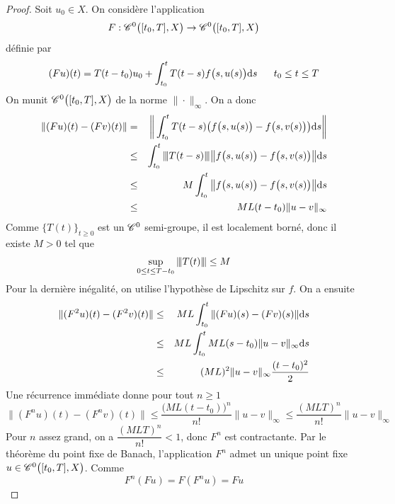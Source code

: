 \begin{proof}
    Soit $u_0 \in X$. On considère l'application 
    \begin{equation*}
        F : \mathscr{C}^0\big([t_0,T],X\big) \rightarrow \mathscr{C}^0\big([t_0,T],X\big)
    \end{equation*}
    définie par 
    \begin{equation*}
        (Fu)(t) = T(t-t_0)u_0 + \int_{t_0}^t T(t-s)f\big(s,u(s)\big)\mathrm{d} s \ \ \ \ \ t_0 \leq t \leq T
    \end{equation*}
    On munit $\mathscr{C}^0\big([t_0,T],X\big)$ de la norme $\|\cdot\|_{\infty}$. On a donc 
    \begin{eqnarray*}
        \|(Fu)(t)-(Fv)(t)\| &=& \bigg\|\int_{t_0}^tT(t-s)\big(f\big(s,u(s)\big)-f\big(s,v(s)\big)\big)\mathrm{d} s\bigg\| \\
        &\leq& \int_{t_0}^t {\left\vert\kern-0.25ex\left\vert \kern-0.25ex\left\vert T(t-s) \right\vert\kern-0.25ex\right\vert\kern-0.25ex\right\vert} \big\|f\big(s,u(s)\big)-f\big(s,v(s)\big)\big\|\mathrm{d} s \\
        &\leq& M \int_{t_0}^t \big\|f\big(s,u(s)\big)-f\big(s,v(s)\big)\big\|\mathrm{d} s \\
        &\leq& ML(t-t_0)\|u-v\|_{\infty}
    \end{eqnarray*}
    Comme $\big\{T(t)\big\}_{t \geq 0}$ est un $\mathscr{C}^0$ semi-groupe, il est localement borné, donc il existe $M>0$ tel que 
    \begin{equation*}
        \sup_{0 \leq t \leq T-t_0} {\left\vert\kern-0.25ex\left\vert \kern-0.25ex\left\vert T(t) \right\vert\kern-0.25ex\right\vert\kern-0.25ex\right\vert} \leq M
    \end{equation*}
    Pour la dernière inégalité, on utilise l'hypothèse de Lipschitz sur $f$. On a ensuite 
    \begin{eqnarray*}
        \|(F^2u)(t)-(F^2v)(t)\| &\leq& ML \int_{t_0}^t \|(Fu)(s)-(Fv)(s)\| \mathrm{d} s\\
        &\leq& ML \int_{t_0}^t ML(s-t_0)\|u-v\|_{\infty}\mathrm{d} s \\
        &\leq& (ML)^2 \|u-v\|_{\infty}\frac{(t-t_0)^2}{2}
    \end{eqnarray*}
    Une récurrence immédiate donne pour tout $n \geq 1$
    \begin{equation*}
        \|(F^nu)(t)-(F^nv)(t)\| \leq \frac{\big(ML(t-t_0)\big)^n}{n!}\|u-v\|_{\infty} \leq \frac{(MLT)^n}{n!}\|u-v\|_{\infty}
    \end{equation*}
    Pour $n$ assez grand, on a $\dfrac{(MLT)^n}{n!}<1$, donc $F^n$ est contractante. Par le théorème du point fixe de Banach, l'application $F^n$ admet un unique point fixe $u \in \mathscr{C}^0\big([t_0,T],X\big)$. Comme 
    \begin{equation*}
        F^n(Fu)=F(F^nu) = Fu

\end{equation*}
\end{proof}
